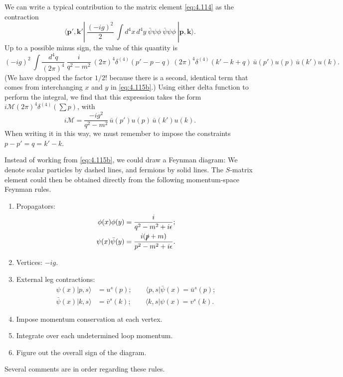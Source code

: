 We can write a typical contribution to the matrix element \eqref{eq:4.114} as
the contraction
\begin{equation}
  \langle \mathbf{p}',\mathbf{k}'|\ \frac{(-ig)^2}{2}\
    \int d^4x\,d^4y\ \bar{\psi}\psi\phi\ \bar{\psi}\psi\phi\
    |\mathbf{p},\mathbf{k}\rangle .
  \label{eq:4.115b}
\end{equation}
Up to a possible minus sign, the value of this quantity is
\begin{equation}
  (-ig)^2\ \int \frac{d^4q}{(2\pi)^4}\ \frac{i}{q^2-m^2}\
    (2\pi)^4\delta^{(4)}(p'-p-q)\ (2\pi)^4\delta^{(4)}(k'-k+q)
    \ \bar{u}(p')u(p)\,\bar{u}(k')u(k) .
  \label{eq:4.115c}
\end{equation}
(We have dropped the factor $1/2!$ because there is a second, identical term
that comes from interchanging $x$ and $y$ in \eqref{eq:4.115b}.)  Using
either delta function to perform the integral, we find that this expression
takes the form $i\mathcal{M}(2\pi)^4\delta^{(4)}(\sum p)$, with
\begin{equation}
  i\mathcal{M} = \frac{-ig^2}{q^2-m^2}\,
    \bar{u}(p')u(p)\,\bar{u}(k')u(k) .
  \label{eq:4.116}
\end{equation}
When writing it in this way, we must remember to impose the constraints
$p - p' = q = k' - k$.

Instead of working from \eqref{eq:4.115b}, we could draw a Feynman diagram:
We denote scalar particles by dashed lines, and fermions by solid lines.  The
$S$-matrix element could then be obtained directly from the following
momentum-space Feynman rules.
\begin{enumerate}
  \item Propagators:
    \begin{align}
      \phi(x)\phi(y) &= \frac{i}{q^2-m^2+i\epsilon};\label{eq:4.117a}\\
      \psi(x)\bar{\psi}(y) &= \frac{i(\slashed{p}+m)}{p^2-m^2+i\epsilon}
        .\label{eq:4.117b}
    \end{align}
  \item Vertices: $-ig$.
  \item External leg contractions:
    \begin{align}
      \psi(x)|p, s\rangle &= u^s(p);\qquad
      \langle p, s|\bar{\psi}(x) = \bar{u}^s(p);\nonumber\\
      \bar{\psi}(x)|k, s\rangle &= \bar{v}^s(k);\qquad
      \langle k, s|\psi(x) = v^s(k) .
    \end{align}
  \item Impose momentum conservation at each vertex.
  \item Integrate over each undetermined loop momentum.
  \item Figure out the overall sign of the diagram.
\end{enumerate}
Several comments are in order regarding these rules.

